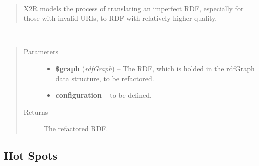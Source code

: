 \documentclass[letterpaper,10pt,english]{sphinxmanual}
\begin{document}
\begin{fulllineitems}
\label{docs/api:X2R}~\begin{quote}

X2R models the process of translating an imperfect RDF, especially for those with invalid URIs, to RDF with relatively higher quality.
\end{quote}

\begin{fulllineitems}
\label{docs/api:X2R::transformation}~\begin{quote}\begin{description}
\item[{Parameters}] \leavevmode\begin{itemize}
\item {} 
\textbf{\$graph} (\emph{rdfGraph}) -- The RDF, which is holded in the rdfGraph data structure, to be refactored.

\item {} 
\textbf{configuration} -- to be defined.

\end{itemize}

\item[{Returns}] \leavevmode
The refactored RDF.

\end{description}\end{quote}

\end{fulllineitems}


\end{fulllineitems}



\subsection{Hot Spots}
\label{docs/api:hot-spots}
\end{document}
